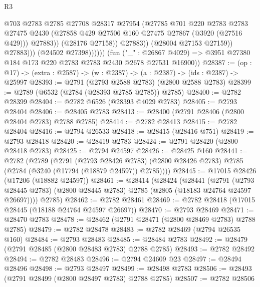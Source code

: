 \begin{lexlean}{R3}
\begin{coremodule}
                                @703
                                @2783
                                @2785
                                @27708
                                @28317
                                @27954
                                (@27785
                                  @701
                                  @220
                                  @2783
                                  @2783
                                  @27475
                                  @2430
                                  (@27858 @429 @27506 @160 @27475 @27867 (@3920 (@27516 @429)))
                                  @27883))
                              (@28176 @27158))
                            @27883))
                        (@28004 @27153 @27159))
                      @27883)))
                (@24502 @27398))))))
      (fun ("_" : @26867 @4029) =>
      @3951 @27380 @184 @173 @220 @2783 @2783 @2430 @2678 @27531 @16900))
@28387 := (op : @17) -> (extra : @2587) -> (w : @2387) -> (a : @2387) -> (ids : @2387) -> @25997
@28393 := @2791 (@2793 @2588 @2783) (@2800 @2588 @2783)
@28399 := @2789 (@6532 (@2784 (@28393 @2785 @2785)) @2785)
@28400 := @2782 @28399
@28404 := @2782 @6526 (@28393 @4029 @2783)
@28405 := @2793 @28404
@28406 := @28405 @2783
@28413 := @28400 (@2791 @28406 (@2800 @28404 @2783) @2788 @2785)
@28414 := @2782 @28413
@28415 := @2782 @28404
@28416 := @2794 @26533
@28418 := @28415 (@28416 @751)
@28419 := @2793 @28418
@28420 := @28419 @2783
@28424 := @2791 @28420 (@2800 @28418 @2783)
@28425 := @2794 @24597
@28426 := @28425 @160
@28441 := @2782
    (@2789
      (@2791
        (@2793 @28426 @2783)
        (@2800 @28426 @2783)
        @2785
        (@2784 (@3240 (@17794 (@18879 @24597)) @2785))))
@28445 := @17015 @28426 (@17206 (@18882 @24597))
@28461 := @28414
    (@28424
      (@28441
        (@2791
          (@2793 @28445 @2783)
          (@2800 @28445 @2783)
          @2785
          (@2805 (@18183 @24764 @24597 @26697))))
      @2785)
@28462 := @2782 @28461
@28469 := @2782 @28418 (@17015 @28445 (@18188 @24764 @24597 @26697))
@28470 := @2793 @28469
@28471 := @28470 @2783
@28478 := @28462 (@2791 @28471 (@2800 @28469 @2783) @2788 @2785)
@28479 := @2782 @28478
@28483 := @2782 @28469 (@2794 @26535 @160)
@28484 := @2793 @28483
@28485 := @28484 @2783
@28492 := @28479 (@2791 @28485 (@2800 @28483 @2783) @2788 @2785)
@28493 := @2782 @28492
@28494 := @2782 @28483
@28496 := @2794 @24609 @23
@28497 := @28494 @28496
@28498 := @2793 @28497
@28499 := @28498 @2783
@28506 := @28493 (@2791 @28499 (@2800 @28497 @2783) @2788 @2785)
@28507 := @2782 @28506

\end{coremodule}
\end{lexlean}
